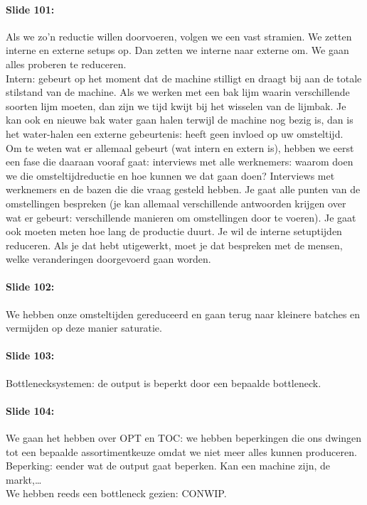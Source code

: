 \documentclass[10pt,a4paper]{report}
\begin{document}
\paragraph{Slide 101:} Als we zo'n reductie willen doorvoeren, volgen we een vast stramien. We zetten interne en externe setups op. Dan zetten we interne naar externe om.
We gaan alles proberen te reduceren. \\
Intern: gebeurt op het moment dat de machine stilligt en draagt bij aan de totale stilstand van de machine. Als we werken met een bak lijm waarin verschillende soorten lijm moeten, dan zijn we tijd kwijt bij het wisselen van de lijmbak. Je kan ook en nieuwe bak water gaan halen terwijl de machine nog bezig is, dan is het water-halen een externe gebeurtenis: heeft geen invloed op uw omsteltijd. \\
Om te weten wat er allemaal gebeurt (wat intern en extern is), hebben we eerst een fase die daaraan vooraf gaat: interviews met alle werknemers: waarom doen we die omsteltijdreductie en hoe kunnen we dat gaan doen? Interviews met werknemers en de bazen die die vraag gesteld hebben. Je gaat alle punten van de omstellingen bespreken (je kan allemaal verschillende antwoorden krijgen over wat er gebeurt: verschillende manieren om omstellingen door te voeren). Je gaat ook moeten meten hoe lang de productie duurt. Je wil de interne setuptijden reduceren. Als je dat hebt utigewerkt, moet je dat bespreken met de mensen, welke veranderingen doorgevoerd gaan worden. 

\paragraph{Slide 102:} We hebben onze omsteltijden gereduceerd en gaan terug naar kleinere batches en vermijden op deze manier saturatie.

\paragraph{Slide 103:} Bottlenecksystemen: de output is beperkt door een bepaalde bottleneck. 

\paragraph{Slide 104:} We gaan het hebben over OPT en TOC: we hebben beperkingen die ons dwingen tot een bepaalde assortimentkeuze omdat we niet meer alles kunnen produceren.\\
Beperking: eender wat de output gaat beperken. Kan een machine zijn, de markt,…\\
We hebben reeds een bottleneck gezien: CONWIP.
\end{document}
